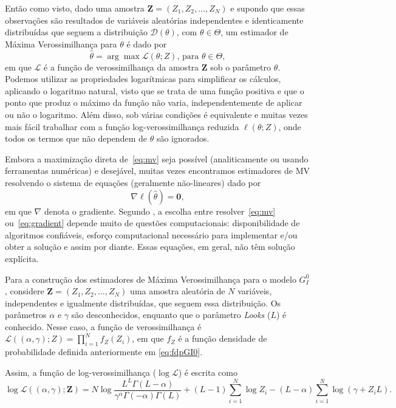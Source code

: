 Então como visto, dado uma amostra $\bm Z = (Z_1, Z_2, \dots, Z_N)$ e supondo que essas observações são resultados de variáveis aleatórias independentes e identicamente distribuídas que seguem a distribuição $\mathcal D(\theta)$, com $\theta \in \Theta$, um estimador de Máxima Verossimilhança para $\theta$ é dado por
\begin{equation}
    \widehat{\theta} = \arg\max \mathcal L(\theta; Z) \text{, para } \theta \in \Theta, \label{eq:mv}
\end{equation}
em que $\mathcal L$ é a função de verossimilhança da amostra $\bm Z$ sob o parâmetro $\theta$. Podemos utilizar as propriedades logarítmicas para simplificar os cálculos, aplicando o logaritmo natural, visto que se trata de uma função positiva e que o ponto que produz o máximo da função não varia, independentemente de aplicar ou não o logaritmo. 
Além disso, sob várias condições é equivalente e muitas vezes mais fácil trabalhar com a função log-verossimilhança reduzida $ \ell (\theta; Z)$, onde todos os termos que não dependem de $\theta$ são ignorados.

Embora a maximização direta de~\eqref{eq:mv} seja possível (analiticamente ou usando ferramentas numéricas) e desejável, muitas vezes encontramos estimadores de MV resolvendo o sistema de equações (geralmente não-lineares) dado por
\begin{equation}
    \nabla \ell (\widehat{\theta}) = \bm 0, \label{eq:gradient} 
\end{equation}
em que $\nabla$ denota o gradiente. 
Segundo \citet{FreryMinute2004}, a escolha entre resolver~\eqref{eq:mv} ou~\eqref{eq:gradient} depende muito de questões computacionais: disponibilidade de algoritmos confiáveis, esforço computacional necessário para implementar e/ou obter a solução e assim por diante. 
Essas equações, em geral, não têm solução explícita.

Para a construção dos estimadores de Máxima Verossimilhança para o modelo $G_I^0$, considere $\bm Z = (Z_1, Z_2, \dots, Z_N)$ uma amostra aleatória de $N$ variáveis, independentes e igualmente distribuídas, que seguem essa distribuição. 
Os parâmetros $\alpha$ e $\gamma$ são desconhecidos, enquanto que o parâmetro \textit{Looks} ($L$) é conhecido. 
Nesse caso, a função de verossimilhança é $\mathcal L((\alpha, \gamma); Z) = \prod_{i=1}^{N} f_Z(Z_i)$, em que $f_Z$ é a função densidade de probabilidade definida anteriormente em \eqref{eq:fdpGI0}. 

Assim, a função de log-verossimilhança ($\log \mathcal L$) é escrita como
\begin{equation}
    \log \mathcal L((\alpha, \gamma); \bm Z) = N\log \frac{L^{L}\Gamma(L-\alpha)}{\gamma^{\alpha}\Gamma(-\alpha)\Gamma(L)} +  (L-1)\sum_{i=1}^{N}\log Z_i - (L-\alpha)\sum_{i=1}^{N}\log (\gamma + Z_iL). \label{eq:logVer}
\end{equation}


